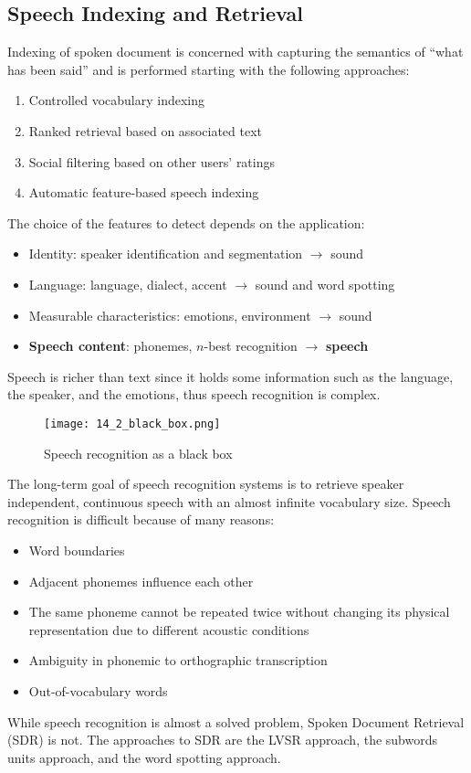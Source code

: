 \documentclass{article}
\begin{document}
\subsection{Speech Indexing and Retrieval}
Indexing of spoken document is concerned with capturing the semantics of “what has been said” and is performed starting with the following approaches:
\begin{enumerate}
    \item Controlled vocabulary indexing
    \item Ranked retrieval based on associated text
    \item Social filtering based on other users’ ratings
    \item Automatic feature-based speech indexing
\end{enumerate}
The choice of the features to detect depends on the application:
\begin{itemize}
    \item Identity: speaker identification and segmentation $ \rightarrow $ sound
    \item Language: language, dialect, accent $ \rightarrow $ sound and word spotting
    \item Measurable characteristics: emotions, environment $ \rightarrow $ sound
    \item \textbf{Speech content}: phonemes, $n$-best recognition $ \rightarrow $ \textbf{speech}
\end{itemize}
Speech is richer than text since it holds some information such as the language, the speaker, and the emotions, thus speech recognition is complex.
\begin{figure}[H]
    \centering
    \texttt{[image: 14\_2\_black\_box.png]}
    \caption{Speech recognition as a black box}
\end{figure}
The long-term goal of speech recognition systems is to retrieve speaker independent, continuous speech with an almost infinite vocabulary size.
Speech recognition is difficult because of many reasons:
\begin{itemize}
    \item Word boundaries
    \item Adjacent phonemes influence each other
    \item The same phoneme cannot be repeated twice without changing its physical representation due to different acoustic conditions
    \item Ambiguity in phonemic to orthographic transcription
    \item Out-of-vocabulary words
\end{itemize}
While speech recognition is almost a solved problem, Spoken Document Retrieval (SDR) is not. The approaches to SDR are the LVSR approach, the subwords units approach, and the word spotting approach.
\end{document}
